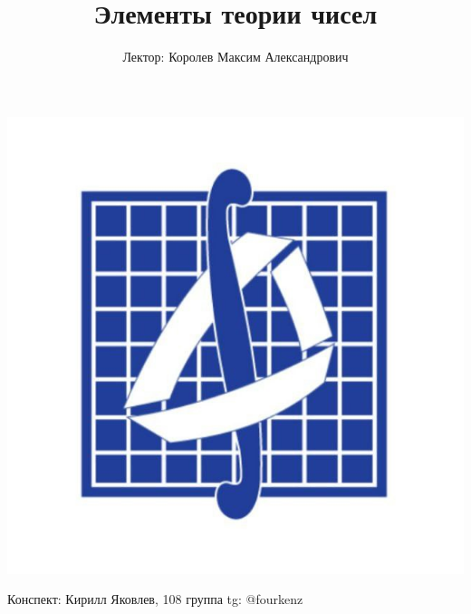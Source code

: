 \documentclass[a4paper, 12pt]{article}
\title{\textbf{Элементы теории чисел}}
\author{Лектор: Королев Максим Александрович}
\newcommand\tab[1][.5cm]{\hspace*{#1}}
\theoremstyle{definition}
\begin{document}
    \fontsize{14pt}{20pt}\selectfont
    \maketitle
    \vspace{1cm}
    \begin{center}
        \includegraphics[width=0.8\linewidth]{mehmat.png}
    \end{center}
    \vspace{1.5cm}
    \begin{center}
        Конспект: Кирилл Яковлев, 108 группа \tab[5.5cm] tg: @fourkenz
    \end{center}
    \newpage
    \tableofcontents
    \fontsize{14pt}{20pt}\selectfont
    \newpage
\end{document}
